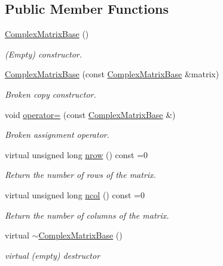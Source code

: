 \subsection*{Public Member Functions}
\begin{DoxyCompactItemize}
\item 
\hyperlink{classoomph_1_1ComplexMatrixBase_aecfeaf77e3e03743b0b87f677470c56d}{Complex\+Matrix\+Base} ()
\begin{DoxyCompactList}\small\item\em (Empty) constructor. \end{DoxyCompactList}\item 
\hyperlink{classoomph_1_1ComplexMatrixBase_a000722ba16915a4b9770238997b43d19}{Complex\+Matrix\+Base} (const \hyperlink{classoomph_1_1ComplexMatrixBase}{Complex\+Matrix\+Base} \&matrix)
\begin{DoxyCompactList}\small\item\em Broken copy constructor. \end{DoxyCompactList}\item 
void \hyperlink{classoomph_1_1ComplexMatrixBase_aa1c04df6907d8f8b6517ede080b86705}{operator=} (const \hyperlink{classoomph_1_1ComplexMatrixBase}{Complex\+Matrix\+Base} \&)
\begin{DoxyCompactList}\small\item\em Broken assignment operator. \end{DoxyCompactList}\item 
virtual unsigned long \hyperlink{classoomph_1_1ComplexMatrixBase_adcbdf19bc82c61c0a4fbfd8c8de97b3b}{nrow} () const =0
\begin{DoxyCompactList}\small\item\em Return the number of rows of the matrix. \end{DoxyCompactList}\item 
virtual unsigned long \hyperlink{classoomph_1_1ComplexMatrixBase_a849b63e50dad36ca8b20b7bdefd34b8d}{ncol} () const =0
\begin{DoxyCompactList}\small\item\em Return the number of columns of the matrix. \end{DoxyCompactList}\item 
virtual \hyperlink{classoomph_1_1ComplexMatrixBase_a5b6bb3011ea7b08dead73e943fd74b15}{$\sim$\+Complex\+Matrix\+Base} ()
\begin{DoxyCompactList}\small\item\em virtual (empty) destructor \end{DoxyCompactList}\item 

\end{DoxyCompactItemize}
